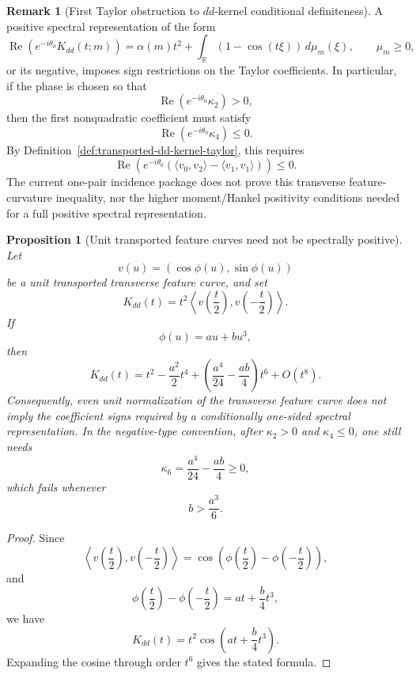 \documentclass[11pt,a4paper]{amsart}
\theoremstyle{plain}
\newtheorem{proposition}[theorem]{Proposition}
\theoremstyle{definition}
\newtheorem{remark}[theorem]{Remark}
\begin{document}
\begin{remark}[First Taylor obstruction to \(dd\)-kernel conditional definiteness]
\label{rem:first-taylor-obstruction-dd-conditional-definiteness}
A positive spectral representation of the form
\[
\operatorname{Re}(e^{-i\theta_0}K_{dd}(t;m))
=
\alpha(m)t^2+\int_{\mathbb R}(1-\cos(t\xi))\,d\mu_m(\xi),
\qquad
\mu_m\ge0,
\]
or its negative, imposes sign restrictions on the Taylor coefficients.  In
particular, if the phase is chosen so that
\[
\operatorname{Re}(e^{-i\theta_0}\kappa_2)>0,
\]
then the first nonquadratic coefficient must satisfy
\[
\operatorname{Re}(e^{-i\theta_0}\kappa_4)\le0.
\]
By Definition~\ref{def:transported-dd-kernel-taylor}, this requires
\[
\operatorname{Re}
\left(
e^{-i\theta_0}
\left(
\langle v_0,v_2\rangle-\langle v_1,v_1\rangle
\right)
\right)
\le0.
\]
The current one-pair incidence package does not prove this transverse
feature-curvature inequality, nor the higher moment/Hankel positivity
conditions needed for a full positive spectral representation.
\end{remark}

\begin{proposition}[Unit transported feature curves need not be spectrally positive]
\label{prop:unit-feature-curve-not-spectrally-positive}
Let
\[
v(u)=(\cos\phi(u),\sin\phi(u))
\]
be a unit transported transverse feature curve, and set
\[
K_{dd}(t)=
t^2
\left\langle
v\!\left(\frac t2\right),
v\!\left(-\frac t2\right)
\right\rangle.
\]
If
\[
\phi(u)=au+bu^3,
\]
then
\[
K_{dd}(t)
=
t^2
-\frac{a^2}{2}t^4
+
\left(
\frac{a^4}{24}-\frac{ab}{4}
\right)t^6
+
O(t^8).
\]
Consequently, even unit normalization of the transverse feature curve does
not imply the coefficient signs required by a conditionally one-sided spectral
representation.  In the negative-type convention, after
\(\kappa_2>0\) and \(\kappa_4\le0\), one still needs
\[
\kappa_6
=
\frac{a^4}{24}-\frac{ab}{4}
\ge0,
\]
which fails whenever
\[
b>\frac{a^3}{6}.
\]
\end{proposition}

\begin{proof}
Since
\[
\left\langle
v\!\left(\frac t2\right),
v\!\left(-\frac t2\right)
\right\rangle
=
\cos\left(
\phi\!\left(\frac t2\right)-\phi\!\left(-\frac t2\right)
\right),
\]
and
\[
\phi\!\left(\frac t2\right)-\phi\!\left(-\frac t2\right)
=
at+\frac b4t^3,
\]
we have
\[
K_{dd}(t)=t^2\cos\left(at+\frac b4t^3\right).
\]
Expanding the cosine through order \(t^6\) gives the stated formula.
\end{proof}
\end{document}
